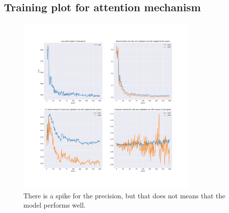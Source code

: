 \chapter{} \label{Appendix2}
\section{Training plot for attention mechanism}
\begin{figure}[h]
	\centering
	\includegraphics[width=0.8\textwidth]{images/chapitre4/appendix2_1.pdf}
	\caption{There is a spike for the precision, but that does not means that the model performs well.}
	\label{appendix2:training_plot1}
\end{figure}